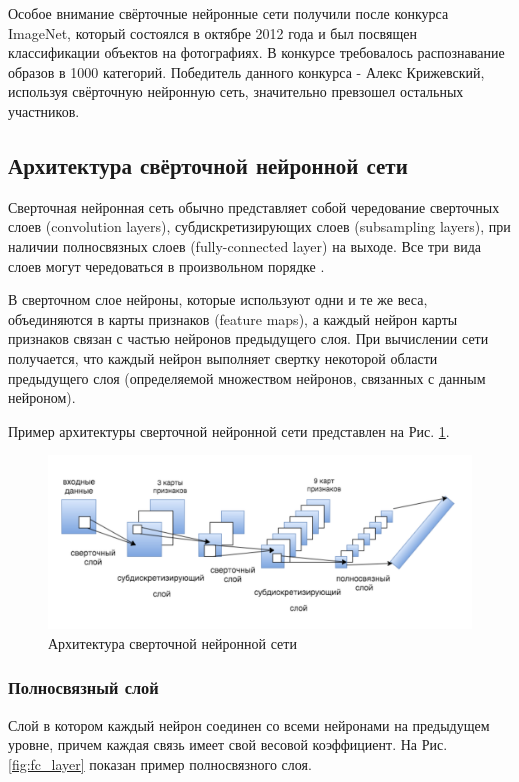 Особое внимание свёрточные нейронные сети получили после конкурса ImageNet\cite{imagenet}, который состоялся в октябре 2012 года и был посвящен классификации объектов на фотографиях. В конкурсе требовалось распознавание образов в 1000 категорий. Победитель данного конкурса - Алекс Крижевский, используя свёрточную нейронную сеть, значительно превзошел остальных участников\cite{alexnet}.

\subsection{Архитектура свёрточной нейронной сети} \label{cnnarch}
Сверточная нейронная сеть обычно представляет собой чередование сверточных слоев (convolution layers), субдискретизирующих слоев (subsampling layers), при наличии полносвязных слоев (fully-connected layer) на выходе. Все три вида слоев могут чередоваться в произвольном порядке \cite{LeCun1998GradientbasedLA}.

В сверточном слое нейроны, которые используют одни и те же веса, объединяются в карты признаков (feature maps), а каждый нейрон карты признаков связан с частью нейронов предыдущего слоя. При вычислении сети получается, что каждый нейрон выполняет свертку некоторой области предыдущего слоя (определяемой множеством нейронов, связанных с данным нейроном).

Пример архитектуры сверточной нейронной сети представлен на Рис. \ref{fig:convnet}.
\begin{figure}[h]
    \centering
    \includegraphics [width=\textwidth*2/3] {images/convnet.png}
    \caption{ Архитектура сверточной нейронной сети}
    \label{fig:convnet}
\end{figure}

\subsubsection{Полносвязный слой} \label{fc_layers}
Слой в котором каждый нейрон соединен со всеми нейронами на предыдущем уровне, причем каждая связь имеет свой весовой коэффициент. На Рис.\ref{fig:fc_layer} показан пример полносвязного слоя.

